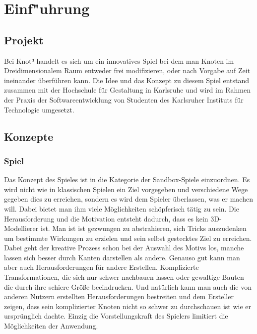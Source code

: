 %
%


\chapter{Einf{"u}hrung}
\label{EF}


\section{Projekt}

Bei Knot³ handelt es sich um ein innovatives Spiel bei dem man Knoten im Dreidimensionalem Raum entweder frei modifizieren, oder nach Vorgabe auf Zeit ineinander überführen kann.
Die Idee und das Konzept zu diesem Spiel entstand zusammen mit der Hochschule für Gestaltung in Karlsruhe und wird im Rahmen der Praxis der Softwareentwicklung von Studenten des Karlsruher Instituts für Technologie umgesetzt.

\section{Konzepte}
\label{EF:Konzepte}

\subsection{Spiel}

Das Konzept des Spieles ist in die Kategorie der Sandbox-Spiele einzuordnen. Es wird nicht wie in klassischen Spielen ein Ziel vorgegeben und verschiedene Wege gegeben dies zu erreichen, sondern es wird dem Spieler überlassen, was er machen will. Dabei bietet man ihm viele Möglichkeiten schöpferisch tätig zu sein. Die Herausforderung und die Motivation entsteht dadurch, dass es kein 3D-Modellierer ist. Man ist ist gezwungen zu abstrahieren, sich Tricks auszudenken um bestimmte Wirkungen zu erzielen und sein selbst gestecktes Ziel zu erreichen. Dabei geht der kreative Prozess schon bei der Auswahl des Motivs los, manche lassen sich besser durch Kanten darstellen als andere.
Genauso gut kann man aber auch Herausforderungen für andere Erstellen. Komplizierte Transformationen, die sich nur schwer nachbauen lassen oder gewaltige Bauten die durch ihre schiere Größe beeindrucken. Und natürlich kann man auch die von anderen Nutzern erstellten Herausforderungen bestreiten und dem Ersteller zeigen, dass sein komplizierter Knoten nicht so schwer zu durchschauen ist wie er ursprünglich dachte.
Einzig die Vorstellungskraft des Spielers limitiert die Möglichkeiten der Anwendung.


